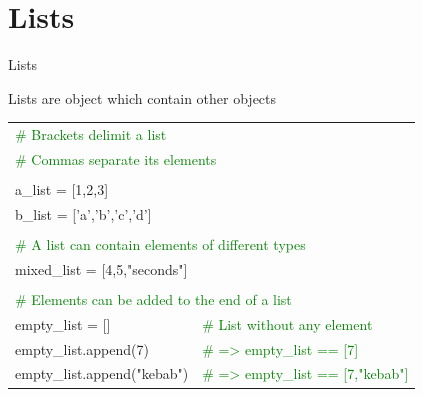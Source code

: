 \documentclass[serif, aspectratio=169]{beamer}
\newcommand{\tgreen}[1]{\textcolor{green}{#1}}
\newenvironment{CLI} %
    {
    \noindent
    \ttfamily 
    \footnotesize
    \begin{tcolorbox}[colback=gray!150,colframe=black]
    \color{white}
    \begin{tabular}{p{4.5cm}p{7.5cm}}
    }
    { 
    \end{tabular}
    \end{tcolorbox}
    }
\begin{document}
\section{Lists}

\begin{frame}{Lists}
     \begin{block}{Lists are object which contain other objects}
        \vspace{2pt}
        \begin{CLI}
            \tgreen{\# Brackets delimit a list} & \\
            \multicolumn{2}{l}{\tgreen{\# Commas separate its elements}} \\
            & \\
            a\_list = [1,2,3] & \\
            b\_list = ['a','b','c','d'] & \\
            \pause
            & \\
            \multicolumn{2}{l}{\tgreen{\# A list can contain elements of different types}} \\
            \multicolumn{2}{l}{mixed\_list = [4,5,"seconds"]} \\
            \pause
            & \\
            \multicolumn{2}{l}{\tgreen{\# Elements can be added to the end of a list}} \\
            empty\_list = [] & \tgreen{\# List without any element} \\
            empty\_list.append(7) & \tgreen{\# => empty\_list == [7]} \\
            empty\_list.append("kebab") & \tgreen{\# => empty\_list == [7,"kebab"]} \\
        \end{CLI}
     \end{block}
\end{frame}
\end{document}
